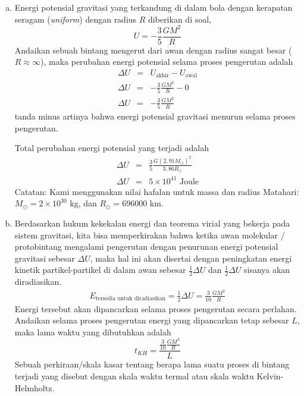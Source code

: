 \documentclass[11pt,fleqn]{exam}
\begin{document}
\begin{questions}
\begin{enumerate}[a.]
    \item Energi potensial gravitasi yang terkandung di dalam bola dengan kerapatan seragam (\textit{uniform}) dengan radius $R$ diberikan di soal,
    \begin{equation*}
        U = - \frac{3}{5} \frac{GM^2}{R}
    \end{equation*}
    Andaikan sebuah bintang mengerut dari awan dengan radius sangat besar ($R \approx \infty$), maka perubahan energi potensial selama proses pengerutan adalah
    \begin{eqnarray*}
        \Delta U &=& U_\text{akhir} - U_\text{awal}\\
        \Delta U &=& - \frac{3}{5} \frac{GM^2}{R} - 0\\
        \Delta U &=& - \frac{3}{5} \frac{GM^2}{R}
    \end{eqnarray*}
    tanda minus artinya bahwa energi potensial gravitasi menurun selama proses pengerutan. 
    
    Total perubahan energi potensial yang terjadi adalah
    \begin{eqnarray*}
        \Delta U &=& \frac{3}{5} \frac{G (2,91 M_\odot)^2}{3,86 R_\odot}\\
        \Delta U &=& 5 \times 10^{41} \text{ Joule}
    \end{eqnarray*} 
    Catatan: Kami menggunakan nilai hafalan untuk massa dan radius Matahari: $M_\odot = 2\times 10^{30}$ kg, dan $R_\odot = 696000$ km.

    \item Berdasarkan hukum kekekalan energi dan teorema virial yang bekerja pada sistem gravitasi, kita bisa memperkirakan bahwa ketika awan molekular / protobintang mengalami pengerutan dengan penurunan energi potensial gravitasi sebesar $\Delta U$, maka hal ini akan disertai dengan peningkatan energi kinetik partikel-partikel di dalam awan sebesar $\frac{1}{2} \Delta U$ dan $\frac{1}{2} \Delta U$ sisanya akan diradiasikan.
    \begin{eqnarray*}
        E_\text{tersedia untuk diradiasikan}  = \frac{1}{2} \Delta U = \frac{3}{10} \frac{GM^2}{R}
    \end{eqnarray*}
    Energi tersebut akan dipancarkan selama proses pengerutan secara perlahan. Andaikan selama proses pengerutan energi yang dipancarkan tetap sebesar $L$, maka lama waktu yang dibutuhkan adalah
    \begin{equation*}
        t_{KH} = \frac{\frac{3}{10} \frac{GM^2}{R}}{L} 
    \end{equation*}
    Sebuah perkiraan/skala kasar tentang berapa lama suatu proses di bintang terjadi yang disebut dengan skala waktu termal atau skala waktu Kelvin-Helmholtz. 


\end{enumerate}
\end{questions}
\end{document}
